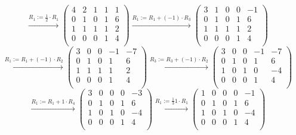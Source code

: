 \documentclass[a4paper]{article}
\begin{document}
\[
\xrightarrow{\text{$R_1 := \frac{1}{2} \cdot R_1$}}
\left(
\begin{array}{cccc|c}
4   & 2   & 1   & 1 & 1  \\
0   & 1   & 0   & 1 & 6  \\
1   & 1   & 1   & 1 & 2  \\
0   & 0   & 0   & 1 & 4   \\
\end{array}
\right)
\xrightarrow{\text{$R_1 := R_1 + (-1) \cdot R_3$}}
\left(
\begin{array}{cccc|c}
3   & 1   & 0   & 0 & -1  \\
0   & 1   & 0   & 1 & 6  \\
1   & 1   & 1   & 1 & 2  \\
0   & 0   & 0   & 1 & 4   \\
\end{array}
\right)
\]
\[
\xrightarrow{\text{$R_1 := R_1 + (-1) \cdot R_2$}}
\left(
\begin{array}{cccc|c}
3   & 0   & 0   & -1 & -7  \\
0   & 1   & 0   & 1 & 6  \\
1   & 1   & 1   & 1 & 2  \\
0   & 0   & 0   & 1 & 4   \\
\end{array}
\right)
\xrightarrow{\text{$R_3 := R_3 + (-1) \cdot R_2$}}
\left(
\begin{array}{cccc|c}
3   & 0   & 0   & -1 & -7  \\
0   & 1   & 0   & 1 & 6  \\
1   & 0   & 1   & 0 & -4  \\
0   & 0   & 0   & 1 & 4   \\
\end{array}
\right)
\]
\[
\xrightarrow{\text{$R_1 := R_1 + 1 \cdot R_4$}}
\left(
\begin{array}{cccc|c}
3   & 0   & 0   & 0 & -3  \\
0   & 1   & 0   & 1 & 6  \\
1   & 0   & 1   & 0 & -4  \\
0   & 0   & 0   & 1 & 4   \\
\end{array}
\right)
\xrightarrow{\text{$R_1 := \frac{1}{3} 1 \cdot R_1$}}
\left(
\begin{array}{cccc|c}
1   & 0   & 0   & 0 & -1  \\
0   & 1   & 0   & 1 & 6  \\
1   & 0   & 1   & 0 & -4  \\
0   & 0   & 0   & 1 & 4   \\
\end{array}
\right)
\]
\end{document}
